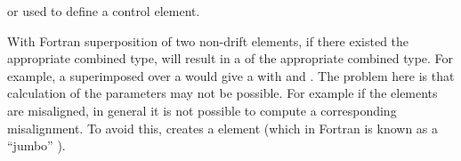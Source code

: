 \begin{description}
or used to define a control element.
%
\item
With Fortran \bmad superposition of two non-drift elements, if there existed the appropriate
combined type, will result in a  of the appropriate combined type. For example,
a  superimposed over a  would give a   with
 and  . The problem here is that calculation of the
 parameters may not be possible. For example if the 
elements are misaligned, in general it is not possible to compute a corresponding 
misalignment. To avoid this, \accellat creates a   element
(which in Fortran \bmad is known as a ``jumbo'' ).
%
\end{description}



